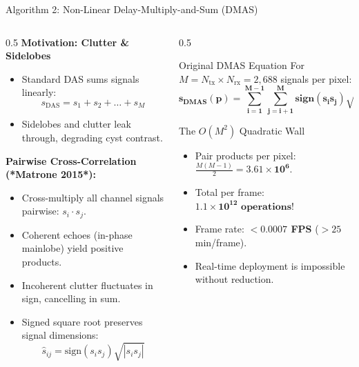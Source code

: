 \documentclass[aspectratio=169,10pt]{beamer}
\begin{document}
\begin{frame}{Algorithm 2: Non-Linear Delay-Multiply-and-Sum (DMAS)}
  \begin{columns}[T]
    \begin{column}{0.5\textwidth}
      \textbf{\small Motivation: Clutter \& Sidelobes}
      \scriptsize
      \begin{itemize}
        \item Standard DAS sums signals linearly:
        $$s_{\text{DAS}} = s_1 + s_2 + \dots + s_M$$
        \item Sidelobes and clutter leak through, degrading cyst contrast.
      \end{itemize}
      \vspace{0.1cm}
      \textbf{\small Pairwise Cross-Correlation (*Matrone 2015*):}
      \scriptsize
      \begin{itemize}
        \item Cross-multiply all channel signals pairwise: $s_i \cdot s_j$.
        \item Coherent echoes (in-phase mainlobe) yield positive products.
        \item Incoherent clutter fluctuates in sign, cancelling in sum.
        \item Signed square root preserves signal dimensions:
        $$\hat{s}_{ij} = \text{sign}(s_i s_j) \sqrt{|s_i s_j|}$$
      \end{itemize}
    \end{column}
    \begin{column}{0.5\textwidth}
      \begin{block}{Original DMAS Equation}
        \scriptsize
        For $M = N_{\text{tx}} \times N_{\text{rx}} = 2,688$ signals per pixel:
        $$\mathbf{s_{\text{DMAS}}(p) = \sum_{i=1}^{M-1} \sum_{j=i+1}^M \text{sign}(s_i s_j) \sqrt{|s_i s_j|}}$$
      \end{block}
      \begin{alertblock}{The $O(M^2)$ Quadratic Wall}
        \scriptsize
        \begin{itemize}
          \item Pair products per pixel: $\frac{M(M-1)}{2} = \mathbf{3.61\times 10^6}$.
          \item Total per frame: $\mathbf{1.1 \times 10^{12}\text{ operations}}$!
          \item Frame rate: \textbf{$< 0.0007$ FPS} ($> 25$ min/frame).
          \item Real-time deployment is impossible without reduction.
        \end{itemize}
      \end{alertblock}
    \end{column}
  \end{columns}
\end{frame}
\end{document}
